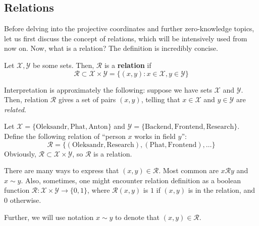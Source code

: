 \documentclass[../lecture-notes.tex]{subfiles}
\begin{document}
\subsection{Relations}\label{section:relations}

Before delving into the projective coordinates and further zero-knowledge topics, let us first discuss the concept of relations, which will be intensively used from now on. Now, what is a relation? The definition is incredibly concise.

\begin{definition}
    Let $\mathcal{X},\mathcal{Y}$ be some sets. Then, $\mathcal{R}$ is a \textbf{relation} if 
    \begin{equation*}
        \mathcal{R} \subset \mathcal{X} \times \mathcal{Y} = \{(x,y): x \in \mathcal{X}, y \in \mathcal{Y}\}
    \end{equation*}
\end{definition}

\vspace{-1mm}

Interpretation is approximately the following: suppose we have sets $\mathcal{X}$ and $\mathcal{Y}$. Then, relation $\mathcal{R}$ gives a set of pairs $(x,y)$, telling that $x \in \mathcal{X}$ and $y \in \mathcal{Y}$ are \textit{related}.

\vspace{-1mm}

\begin{example}
    Let $\mathcal{X} = \{\text{Oleksandr}, \text{Phat}, \text{Anton}\}$ and $\mathcal{Y} = \{\text{Backend}, \text{Frontend}, \text{Research}\}$. Define the following relation of ``person $x$ works in field $y$'':
    \begin{equation*}
        \mathcal{R} = \{(\text{Oleksandr}, \text{Research}), (\text{Phat}, \text{Frontend}), \dots\}
    \end{equation*}
    Obviously, $\mathcal{R} \subset \mathcal{X} \times \mathcal{Y}$, so $\mathcal{R}$ is a relation.
\end{example}

\begin{remark}
    There are many ways to express that $(x,y) \in \mathcal{R}$. Most common are $x \mathcal{R} y$ and $x \sim y$. Also, sometimes, one might encounter relation definition as a boolean function $\mathcal{R}: \mathcal{X} \times \mathcal{Y} \to \{0,1\}$, where $\mathcal{R}(x,y)$ is $1$ if $(x,y)$ is in the relation, and $0$ otherwise.

    Further, we will use notation $x \sim y$ to denote that $(x,y) \in \mathcal{R}$.
\end{remark}
\end{document}
